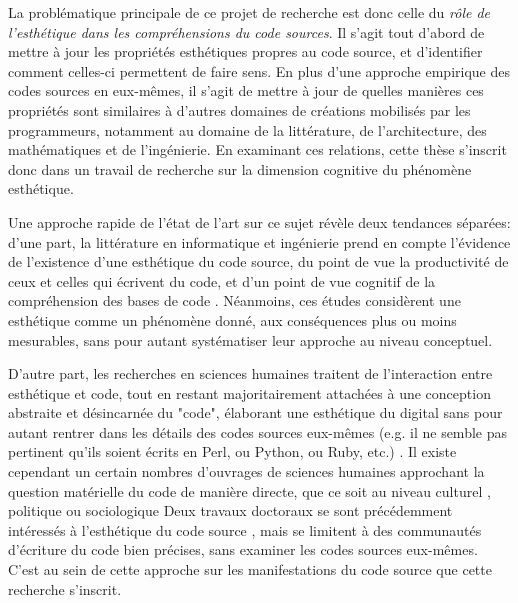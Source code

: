 \documentclass{article}
\begin{document}
La problématique principale de ce projet de recherche est donc celle du \emph{rôle de l'esthétique dans les compréhensions du code sources}. Il s'agit tout d'abord de mettre à jour les propriétés esthétiques propres au code source, et d'identifier comment celles-ci permettent de faire sens. En plus d'une approche empirique des codes sources en eux-mêmes, il s'agit de mettre à jour de quelles manières ces propriétés sont similaires à d'autres domaines de créations mobilisés par les programmeurs, notamment au domaine de la littérature, de l'architecture, des mathématiques et de l'ingénierie. En examinant ces relations, cette thèse s'inscrit donc dans un travail de recherche sur la dimension cognitive du phénomène esthétique.

Une approche rapide de l'état de l'art sur ce sujet révèle deux tendances séparées: d'une part, la littérature en informatique et ingénierie prend en compte l'évidence de l'existence d'une esthétique du code source, du point de vue la productivité de ceux et celles qui écrivent du code, et d'un point de vue cognitif de la compréhension des bases de code \citep{oram_beautiful_2007,cox_programming_2009,gabriel_mob_2001,martin_clean_2008,detienne_software_2001,weinberg_psychology_1998}.  Néanmoins, ces études considèrent une esthétique comme un phénomène donné, aux conséquences plus ou moins mesurables, sans pour autant systématiser leur approche au niveau conceptuel.

D'autre part, les recherches en sciences humaines traitent de l'interaction entre esthétique et code, tout en restant majoritairement attachées à une conception abstraite et désincarnée du "code", élaborant une esthétique du digital sans pour autant rentrer dans les détails des codes sources eux-mêmes (e.g. il ne semble pas pertinent qu'ils soient écrits en Perl, ou Python, ou Ruby, etc.) \citep{cramer_exe_2019,hayles_my_2010,mackenzie_cutting_2006,levy_programmation_1992}. Il existe cependant un certain nombres d'ouvrages de sciences humaines approchant la question matérielle du code de manière directe, que ce soit au niveau culturel \citep{montfort_10_2014}, politique \citep{cox_speaking_2013} ou sociologique \citep{paloque-berges_poetique_2009} Deux travaux doctoraux se sont précédemment intéressés à l'esthétique du code source \citep{black_art_2002,pineiro_aesthetics_2003}, mais se limitent à des communautés d'écriture du code bien précises, sans examiner les codes sources eux-mêmes. C'est au sein de cette approche sur les manifestations du code source que cette recherche s'inscrit.
\end{document}
